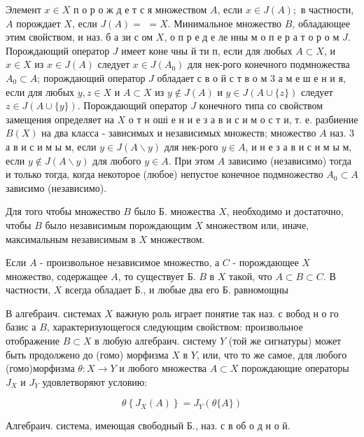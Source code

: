 \documentclass[10pt]{article}
\begin{document}
Элемент $x \in X$ п о р о ж д е т с я множеством $A$, если $x \in J(A) ;$ в частности, $A$ порождает $X$, если $J(A)=$ $=X$. Минимальное множество $B$, обладающее этим свойством, и наз. б а зи с ом $X$, о п р е д е ле нны м о п е р а т о р о м $J$. Порождающий оператор $J$ имеет коне чны й ти п, если для любых $A \subset X$, и $x \in X$ из $x \in J(A)$ следует $x \in J\left(A_{0}\right)$ для нек-рого конечного подмножества $A_{0} \subset A$; порождающий оператор $J$ обладает с в о й с т в $о$ м 3 а м е ш е н и я, если для любых $y, z \in X$ и $A \subset X$ из $y \notin J(A)$ и $y \in J(A \cup\{z\})$ следует $z \in J(A \cup\{y\})$. Порождающий оператор $J$ конечного типа со свойством замещения определяет на $X$ о т н оші е н и е з а в и с и м о с т и, т. е. разбиение $B(X)$ на два класса - зависимых и независимых множеств; множество $A$ наз. 3 а в и с и м ы м, если $y \in J(A \backslash y)$ для нек-рого $y \in A$, и н е з а в и с и м ы м, если $y \notin J(A \backslash y)$ для любого $y \in A$. При этом $A$ зависимо (независимо) тогда и только тогда, когда некоторое (любое) непустое конечное подмножество $A_{0} \subset A$ зависимо (независимо).



Для того чтобы множество $B$ было Б. множества $X$, необходимо и достаточно, чтобы $B$ было независимым порождающим $X$ множеством или, иначе, максимальным независимым в $X$ множеством.



Если $A$ - произвольное независимое множество, а $C$ - порождающее $X$ множество, содержащее $A$, то существует Б. $B$ в $X$ такой, что $A \subset B \subset C$. В частности, $X$ всегда обладает Б., и любые два его Б. равномощны



В алгебраич. системах $X$ важную роль играет понятие так наз. с вобод н о го базис а $B$, характеризующегося следующим свойством: произвольное отображение $B \subset X$ в любую алгебраич. систему $Y$ (той же сигнатуры) может быть продолжено до (гомо) морфизма $X$ в $Y$, или, что то же самое, для любого (гомо)морфизма $\theta: X \rightarrow Y$ и любого множества $A \subset X$ порождающие операторы $J_{X}$ и $J_{Y}$ удовлетворяют условию:



\[

\theta\left\{J_{X}(A)\right\}=J_{Y}(\theta\{A\})

\]



Алгебраич. система, имеющая свободный Б., наз. с в об о д н о й.
\end{document}
